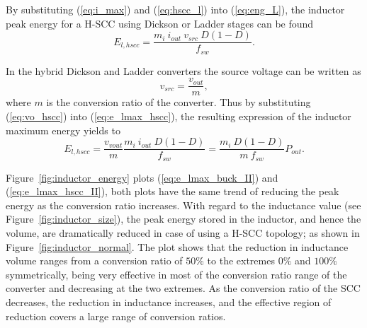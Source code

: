 By substituting (\ref{eq:i_max}) and (\ref{eq:hscc_l}) into (\ref{eq:eng_L}), the inductor peak energy for a H-SCC using Dickson or Ladder stages can be found
\begin{equation}
E_{l,hscc}  =   \frac{ m_{i} ~ i_{out} ~ v_{src} ~ D(1-D)}{f_{sw}}.
\label{eq:e_lmax_hscc}
\end{equation}

In the hybrid Dickson and Ladder converters the source voltage can be written as
\begin{equation}
v_{src}  =  \frac{v_{out}} {m},
\label{eq:vo_hscc}
\end{equation}
where $m$ is the conversion ratio of the converter. Thus by substituting (\ref{eq:vo_hscc}) into (\ref{eq:e_lmax_hscc}), the resulting expression of the inductor maximum energy yields to
\begin{equation}
E_{l,hscc}  =  \frac{v_{vout}}{m} \frac{ m_i ~i_{out} ~ D(1-D)}{f_{sw}} = \frac{m_i~ D (1-D)}{m~ f_{sw}} P_{out}.
\label{eq:e_lmax_hscc_II}
\end{equation}

Figure~\ref{fig:inductor_energy} plots (\ref{eq:e_lmax_buck_II}) and (\ref{eq:e_lmax_hscc_II}), both plots have the same trend of reducing the peak energy as the conversion ratio increases. With regard to the inductance value (see Figure~\ref{fig:inductor_size}), the peak energy stored in the inductor, and hence the volume, are dramatically reduced in case of using a H-SCC topology; as shown in Figure~\ref{fig:inductor_normal}. The plot shows that the reduction in inductance volume ranges from a conversion ratio of $50\%$ to the extremes $0\%$ and $100\%$ symmetrically, being very effective in most of the conversion ratio range of the converter and decreasing at the two extremes. As the conversion ratio of the SCC decreases, the reduction in inductance increases, and the effective region of reduction covers a large range of conversion ratios.


